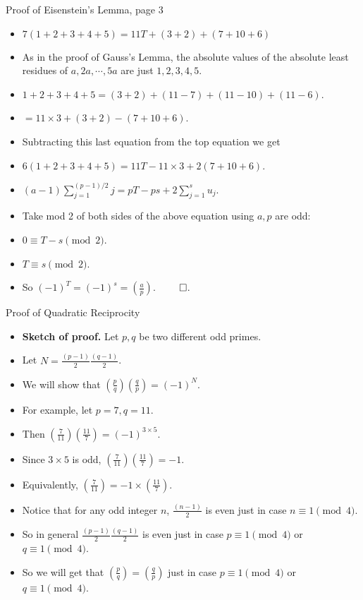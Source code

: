 \documentclass{beamer}
\begin{document}
\begin{frame}{Proof of Eisenstein's Lemma, page 3}

\begin{itemize}
  \item $7(1+2+3+4+5)=11T + (3 + 2) + (7 + 10 + 6)$
  \item As in the proof of Gauss's Lemma, the absolute values of the absolute least residues of
  $a,2a,\cdots, 5a$ are just $1,2,3,4,5$.
  \item $1 + 2 + 3 + 4 + 5 = (3 + 2) + (11 - 7) + (11 - 10) + (11 - 6)$.
  \item $= 11\times 3 + (3 + 2) - (7 + 10 + 6)$.
  \item Subtracting this last equation from the top equation we get
  \item $6(1 + 2 + 3 + 4 + 5) = 11T - 11\times 3 + 2 (7 + 10 + 6)$.
  \item $(a-1)\sum_{j=1}^{(p-1)/2}j = pT - ps + 2 \sum_{j=1}^{s}{u_j}$.
  \item Take mod 2 of both sides of the above equation using $a,p$ are odd:
  \item $0 \equiv T -s \pmod 2$.
  \item $T \equiv s \pmod 2$.
  \item So $(-1)^T = (-1)^s = (\frac{a}{p})$. $\qed$.
\end{itemize}
\end{frame}

\begin{frame}{Proof of Quadratic Reciprocity}

\begin{itemize}
  \item \textbf{Sketch of proof.} Let $p,q$ be two different odd primes.
  \item Let $N = \frac{(p-1)}{2}\frac{(q-1)}{2}$.
  \item We will show that $(\frac{p}{q})(\frac{q}{p}) = (-1)^N$.
  \item For example, let $p=7, q=11$.
  \item Then $(\frac{7}{11})(\frac{11}{7}) = (-1)^{3\times5}$.
  \item Since $3\times 5$ is odd, $(\frac{7}{11})(\frac{11}{7}) = -1$.
  \item Equivalently, $(\frac{7}{11}) = -1 \times (\frac{11}{7})$.
  \item Notice that for any odd integer $n$, $\frac{(n-1)}{2}$ is even just in case $n\equiv 1 \pmod 4$.
  \item So in general $\frac{(p-1)}{2}\frac{(q-1)}{2}$ is even just in case $p\equiv 1 \pmod 4$ or $q\equiv 1 \pmod 4$.
  \item So we will get that $(\frac{p}{q})=(\frac{q}{p})$ just in case $p\equiv 1 \pmod 4$ or $q\equiv 1 \pmod 4$.
\end{itemize}
\end{frame}
\end{document}
